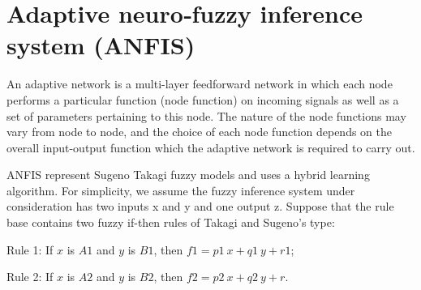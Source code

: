 \section{Adaptive neuro‑fuzzy inference system (ANFIS)}
An adaptive network is a multi-layer feedforward network in which each node performs a particular
function (node function) on incoming signals as well as a set of parameters pertaining to this node. The nature
of the node functions may vary from node to node, and the choice of each node function depends on the overall
input-output function which the adaptive network is required to carry out.

ANFIS represent Sugeno Takagi fuzzy models and uses a hybrid learning algorithm. For simplicity, we assume the fuzzy inference system under consideration has two inputs x and y and one output z. Suppose that the rule base contains two fuzzy if-then rules of Takagi and Sugeno’s type:


Rule 1: If \(x\) is \(A1\) and \(y\) is \(B1\), then \(f1 = p1\ x + q1\ y + r1\);

Rule 2: If \(x\) is \(A2\) and \(y\) is \(B2\), then \(f2 = p2\ x + q2\ y + r\).
